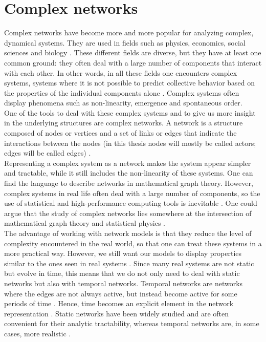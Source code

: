 \documentclass[11 pt , letterpaper , twoside , openright]{book}
\begin{document}
\section{Complex networks}\label{complNet}

Complex networks have become more and more popular for analyzing complex, dynamical systems. They are used in fields such as physics, economics, social sciences and biology \cite{Costa2008}. These different fields are diverse, but they have at least one common ground: they often deal with a large number of components that interact with each other. In other words, in all these fields one encounters complex systems, systems where it is not possible to predict collective behavior based on the properties of the individual components alone \cite{Mata2020}. Complex systems often display phenomena such as non-linearity, emergence and spontaneous order.
\\
\newline
One of the tools to deal with these complex systems and to give us more insight in the underlying structures are complex networks. A network is a structure composed of nodes or vertices and a set of links or edges that indicate the interactions between the nodes (in this thesis nodes will mostly be called actors; edges will be called edges) \cite{Mata2020}.\\
\newline
Representing a complex system as a network makes the system appear simpler and tractable, while it still includes the non-linearity of these systems. One can find the language to describe networks in mathematical graph theory. However, complex systems in real life often deal with a large number of components, so the use of statistical and high-performance computing tools is inevitable \cite{Mata2020}. One could argue that the study of complex networks lies somewhere at the intersection of mathematical graph theory and statistical physics \cite{F.Costa2007}.\\
\newline
The advantage of working with network models is that they reduce the level of complexity encountered in the real world, so that one can treat these systems in a more practical way. However, we still want our models to display properties similar to the ones seen in real systems \cite{Mata2020}. Since many real systems are not static but evolve in time, this means that we do not only need to deal with static networks but also with temporal networks. Temporal networks are networks where the edges are not always active, but instead become active for some periods of time \cite{Holme2012}. Hence, time becomes an explicit element in the network representation \cite{Holme2012}. Static networks have been widely studied and are often convenient for their analytic tractability, whereas temporal networks are, in some cases, more realistic \cite{Mata2020}.\\
\end{document}

